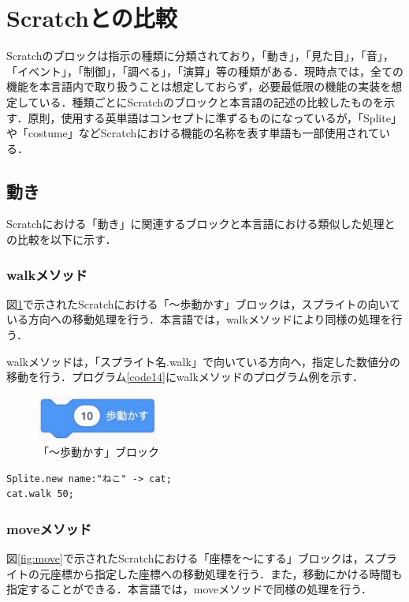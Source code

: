 \documentclass[10pt,a4j]{ltjsarticle}
\begin{document}
\clearpage

\section{Scratchとの比較}
Scratchのブロックは指示の種類に分類されており，「動き」，「見た目」，「音」，「イベント」，「制御」，「調べる」，「演算」等の種類がある．現時点では，全ての機能を本言語内で取り扱うことは想定しておらず，必要最低限の機能の実装を想定している．種類ごとにScratchのブロックと本言語の記述の比較したものを示す．原則，使用する英単語はコンセプトに準ずるものになっているが，「Splite」や「costume」などScratchにおける機能の名称を表す単語も一部使用されている．

\subsection{動き}
Scratchにおける「動き」に関連するブロックと本言語における類似した処理との比較を以下に示す．
\subsubsection{walkメソッド}
図\ref{fig:walk}で示されたScratchにおける「〜歩動かす」ブロックは，スプライトの向いている方向への移動処理を行う．本言語では，walkメソッドにより同様の処理を行う．

walkメソッドは，「スプライト名.walk」で向いている方向へ，指定した数値分の移動を行う．プログラム\ref{code14}にwalkメソッドのプログラム例を示す．

\begin{figure}[H]
  \centering
  \includegraphics[height=15mm]{images/walk.pdf}
  \caption{「〜歩動かす」ブロック}
  \label{fig:walk}
\end{figure}

\begin{lstlisting}[caption=walkメソッドのプログラム例, label=code14]
Splite.new name:"ねこ" -> cat;
cat.walk 50; 
\end{lstlisting}

\subsubsection{moveメソッド}

図\ref{fig:move}で示されたScratchにおける「座標を〜にする」ブロックは，スプライトの元座標から指定した座標への移動処理を行う．また，移動にかける時間も指定することができる．本言語では，moveメソッドで同様の処理を行う．
\end{document}
